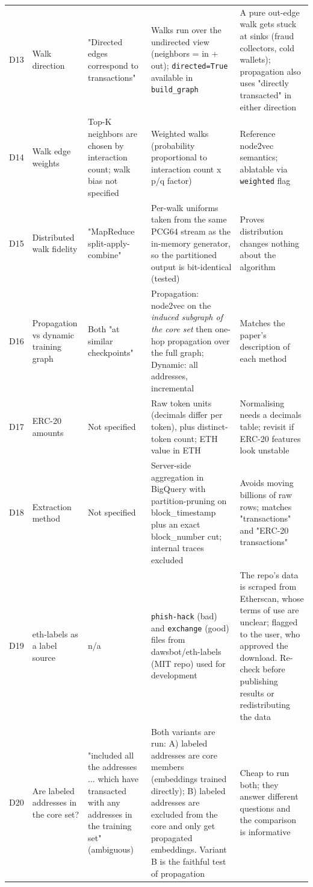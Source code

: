 \begin{longtable}{p{0.7cm} p{2.1cm} p{3.2cm} p{4.2cm} p{3.6cm}}
D13 & Walk direction & "Directed edges correspond to transactions" & Walks run over the undirected view (neighbors = in + out); \texttt{directed=True} available in \texttt{build\_\allowbreak{}graph} & A pure out-edge walk gets stuck at sinks (fraud collectors, cold wallets); propagation also uses "directly transacted" in either direction\\[2pt]
D14 & Walk edge weights & Top-K neighbors are chosen by interaction count; walk bias not specified & Weighted walks (probability proportional to interaction count x p/q factor) & Reference node2vec semantics; ablatable via \texttt{weighted} flag\\[2pt]
D15 & Distributed walk fidelity & "MapReduce split-apply-combine" & Per-walk uniforms taken from the same PCG64 stream as the in-memory generator, so the partitioned output is bit-identical (tested) & Proves distribution changes nothing about the algorithm\\[2pt]
D16 & Propagation vs dynamic training graph & Both "at similar checkpoints" & Propagation: node2vec on the \emph{induced subgraph of the core set} then one-hop propagation over the full graph; Dynamic: all addresses, incremental & Matches the paper's description of each method\\[2pt]
D17 & ERC-20 amounts & Not specified & Raw token units (decimals differ per token), plus distinct-token count; ETH value in ETH & Normalising needs a decimals table; revisit if ERC-20 features look unstable\\[2pt]
D18 & Extraction method & Not specified & Server-side aggregation in BigQuery with partition-pruning on block\_timestamp plus an exact block\_number cut; internal traces excluded & Avoids moving billions of raw rows; matches "transactions" and "ERC-20 transactions"\\[2pt]
D19 & eth-labels as a label source & n/a & \texttt{phish-hack} (bad) and \texttt{exchange} (good) files from dawsbot/eth-labels (MIT repo) used for development & The repo's data is scraped from Etherscan, whose terms of use are unclear; flagged to the user, who approved the download. Re-check before publishing results or redistributing the data\\[2pt]
D20 & Are labeled addresses in the core set? & "included all the addresses ... which have transacted with any addresses in the training set" (ambiguous) & Both variants are run: A) labeled addresses are core members (embeddings trained directly); B) labeled addresses are excluded from the core and only get propagated embeddings. Variant B is the faithful test of propagation & Cheap to run both; they answer different questions and the comparison is informative\\[2pt]

\end{longtable}
